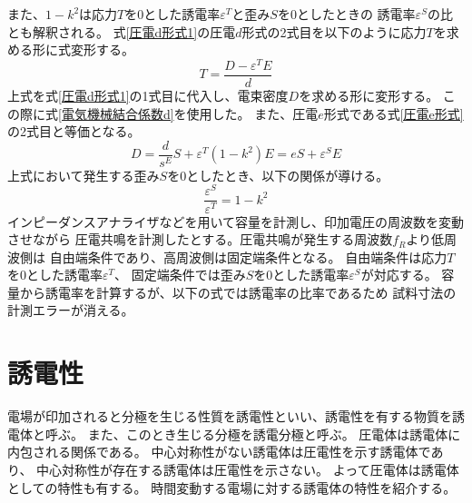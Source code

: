 \documentclass[dvipdfmx,12pt,a4paper]{jreport}
\begin{document}
			また、$1-k^2$は応力$T$を0とした誘電率$\varepsilon^T$と歪み$S$を0としたときの
			誘電率$\varepsilon^S$の比とも解釈される。
			式\eqref{圧電d形式1}の圧電$d$形式の2式目を以下のように応力$T$を求める形に式変形する。			
			\begin{equation}
				T = \frac{D-\varepsilon^T E}{d}
			\end{equation}
			上式を式\eqref{圧電d形式1}の1式目に代入し、電束密度$D$を求める形に変形する。
			この際に式\eqref{電気機械結合係数d}を使用した。
			また、圧電$e$形式である式\eqref{圧電e形式}の2式目と等価となる。
			\begin{equation}
				D = \frac{d}{s^E}S + \varepsilon^T\left(1-k^2\right)E
				  = e S + \varepsilon^S E
			\end{equation}
			上式において発生する歪み$S$を0としたとき、以下の関係が導ける。
			\begin{equation}
				\frac{\varepsilon^S}{\varepsilon^T}=1-k^2
			\end{equation}
			インピーダンスアナライザなどを用いて容量を計測し、印加電圧の周波数を変動させながら
			圧電共鳴を計測したとする。圧電共鳴が発生する周波数$f_R$より低周波側は
			自由端条件であり、高周波側は固定端条件となる。
			自由端条件は応力$T$を0とした誘電率$\varepsilon^T$、
			固定端条件では歪み$S$を0とした誘電率$\varepsilon^S$が対応する。
			容量から誘電率を計算するが、以下の式では誘電率の比率であるため
			試料寸法の計測エラーが消える。
			\newpage
		\section{誘電性}
		電場が印加されると分極を生じる性質を誘電性といい、誘電性を有する物質を誘電体と呼ぶ。
		また、このとき生じる分極を誘電分極と呼ぶ。
		圧電体は誘電体に内包される関係である。
		中心対称性がない誘電体は圧電性を示す誘電体であり、
		中心対称性が存在する誘電体は圧電性を示さない。
		よって圧電体は誘電体としての特性も有する。
		時間変動する電場に対する誘電体の特性を紹介する。
\end{document}
